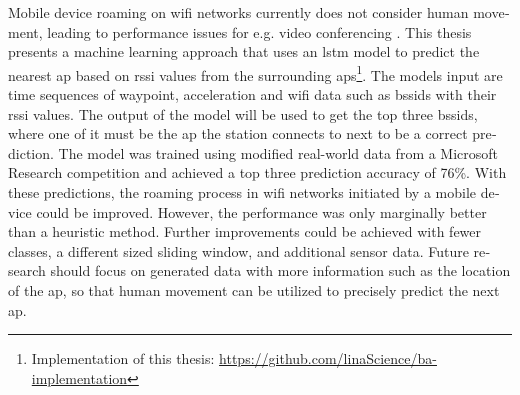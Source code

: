 \null\vfil
\begin{otherlanguage}{english}
\begin{center}\textsf{\textbf{\abstractname}}\end{center}

\noindent 
Mobile device roaming on \ac{wifi} networks currently does not consider human movement, leading to performance issues for e.g. video conferencing \cite{handoff_performance_issues}.
This thesis presents a machine learning approach that uses an \ac{lstm} model to predict the nearest \ac{ap} based on \ac{rssi} values from the surrounding \acp{ap}\footnote{Implementation of this thesis: \url{https://github.com/linaScience/ba-implementation}}.
The models input are time sequences of waypoint, acceleration and \ac{wifi} data such as \acp{bssid} with their \ac{rssi} values.
The output of the model will be used to get the top three \acp{bssid}, where one of it must be the \ac{ap} the station connects to next to be a correct prediction.
The model was trained using modified real-world data from a Microsoft Research competition and achieved a top three prediction accuracy of 76\%.
With these predictions, the roaming process in \ac{wifi} networks initiated by a mobile device could be improved.
However, the performance was only marginally better than a heuristic method.
Further improvements could be achieved with fewer classes, a different sized sliding window, and additional sensor data.
Future research should focus on generated data with more information such as the location of the \ac{ap}, so that human movement can be utilized to precisely predict the next \ac{ap}.
\end{otherlanguage}
\vfil\null




